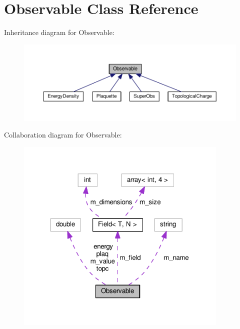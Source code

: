 \hypertarget{classObservable}{}\section{Observable Class Reference}
\label{classObservable}


Inheritance diagram for Observable\+:
\nopagebreak
\begin{figure}[H]
\begin{center}
\leavevmode
\includegraphics[width=350pt]{classObservable__inherit__graph}
\end{center}
\end{figure}


Collaboration diagram for Observable\+:
\nopagebreak
\begin{figure}[H]
\begin{center}
\leavevmode
\includegraphics[width=288pt]{classObservable__coll__graph}
\end{center}
\end{figure}
